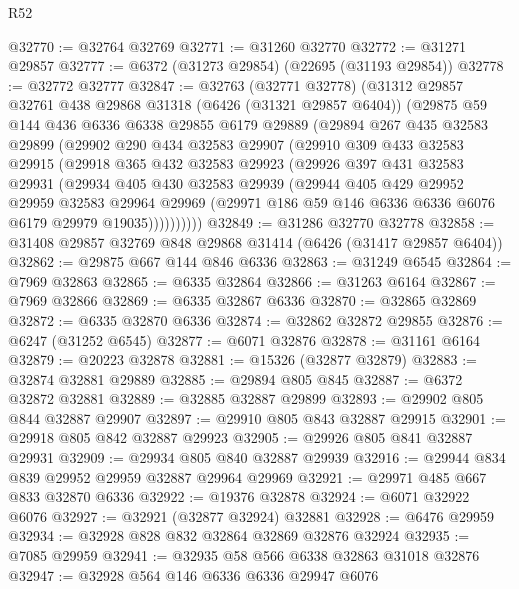 \begin{lexlean}{R52}
\begin{coremodule}
@32770 := @32764 @32769
@32771 := @31260 @32770
@32772 := @31271 @29857
@32777 := @6372 (@31273 @29854) (@22695 (@31193 @29854))
@32778 := @32772 @32777
@32847 := @32763
    (@32771 @32778)
    (@31312
      @29857
      @32761
      @438
      @29868
      @31318
      (@6426 (@31321 @29857 @6404))
      (@29875
        @59
        @144
        @436
        @6336
        @6338
        @29855
        @6179
        @29889
        (@29894
          @267
          @435
          @32583
          @29899
          (@29902
            @290
            @434
            @32583
            @29907
            (@29910
              @309
              @433
              @32583
              @29915
              (@29918
                @365
                @432
                @32583
                @29923
                (@29926
                  @397
                  @431
                  @32583
                  @29931
                  (@29934
                    @405
                    @430
                    @32583
                    @29939
                    (@29944
                      @405
                      @429
                      @29952
                      @29959
                      @32583
                      @29964
                      @29969
                      (@29971 @186 @59 @146 @6336 @6336 @6076 @6179 @29979 @19035))))))))))
@32849 := @31286 @32770 @32778
@32858 := @31408 @29857 @32769 @848 @29868 @31414 (@6426 (@31417 @29857 @6404))
@32862 := @29875 @667 @144 @846 @6336
@32863 := @31249 @6545
@32864 := @7969 @32863
@32865 := @6335 @32864
@32866 := @31263 @6164
@32867 := @7969 @32866
@32869 := @6335 @32867 @6336
@32870 := @32865 @32869
@32872 := @6335 @32870 @6336
@32874 := @32862 @32872 @29855
@32876 := @6247 (@31252 @6545)
@32877 := @6071 @32876
@32878 := @31161 @6164
@32879 := @20223 @32878
@32881 := @15326 (@32877 @32879)
@32883 := @32874 @32881 @29889
@32885 := @29894 @805 @845
@32887 := @6372 @32872 @32881
@32889 := @32885 @32887 @29899
@32893 := @29902 @805 @844 @32887 @29907
@32897 := @29910 @805 @843 @32887 @29915
@32901 := @29918 @805 @842 @32887 @29923
@32905 := @29926 @805 @841 @32887 @29931
@32909 := @29934 @805 @840 @32887 @29939
@32916 := @29944 @834 @839 @29952 @29959 @32887 @29964 @29969
@32921 := @29971 @485 @667 @833 @32870 @6336
@32922 := @19376 @32878
@32924 := @6071 @32922 @6076
@32927 := @32921 (@32877 @32924) @32881
@32928 := @6476 @29959
@32934 := @32928 @828 @832 @32864 @32869 @32876 @32924
@32935 := @7085 @29959
@32941 := @32935 @58 @566 @6338 @32863 @31018 @32876
@32947 := @32928 @564 @146 @6336 @6336 @29947 @6076

\end{coremodule}
\end{lexlean}
